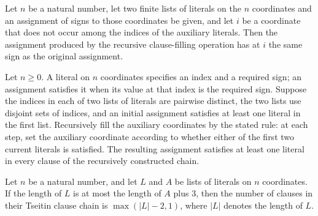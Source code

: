\begin{theorem}
\label{FABL.fillTseitinClauseAux_eq_of_not_mem}
\leanok
{}
Let $n$ be a natural number, let two finite lists of literals on the $n$ coordinates and
an assignment of signs to those coordinates be given, and let $i$ be a coordinate that
does not occur among the indices of the auxiliary literals. Then the assignment produced
by the recursive clause-filling operation has at $i$ the same sign as the original
assignment.
\end{theorem}

\begin{theorem}
\label{FABL.tseitinClauseChain_complete}
\leanok
{}
Let $n\ge 0$. A literal on $n$ coordinates specifies an index and a required sign; an
assignment satisfies it when its value at that index is the required sign. Suppose the
indices in each of two lists of literals are pairwise distinct, the two lists use
disjoint sets of indices, and an initial assignment satisfies at least one literal in
the first list. Recursively fill the auxiliary coordinates by the stated rule: at each
step, set the auxiliary coordinate according to whether either of the first two current
literals is satisfied. The resulting assignment satisfies at least one literal in every
clause of the recursively constructed chain.
\end{theorem}

\begin{theorem}
\label{FABL.length_tseitinClauseChain}
\leanok
{}
Let $n$ be a natural number, and let $L$ and $A$ be lists of literals on $n$
coordinates. If the length of $L$ is at most the length of $A$ plus $3$, then the number
of clauses in their Tseitin clause chain is $\max(|L|-2,1)$, where $|L|$ denotes the
length of $L$.
\end{theorem}

